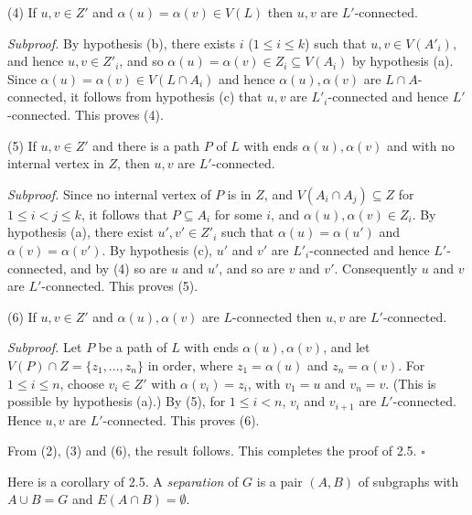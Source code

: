 \hspace*{12pt}(4) If $u, v \in Z'$ and $\alpha(u) = \alpha(v) \in V(L)$ then $u, v$ are $L'$-connected.

\textit{Subproof.} By hypothesis (b), there exists $i$ ($1 \le i \le k$) such that $u, v \in V(A'_i)$, and hence $u, v \in Z'_i$, and so $\alpha(u) = \alpha(v) \in Z_i \subseteq V(A_i)$ by hypothesis (a). Since $\alpha(u) = \alpha(v) \in V(L \cap A_i)$ and hence $\alpha(u), \alpha(v)$ are $L \cap A$-connected, it follows from hypothesis (c) that $u, v$ are $L'_i$-connected and hence $L'$-connected. This proves (4).

\hspace*{12pt}(5) If $u, v \in Z'$ and there is a path $P$ of $L$ with ends $\alpha(u), \alpha(v)$ and with no internal vertex in $Z$, then $u, v$ are $L'$-connected.

\textit{Subproof.} Since no internal vertex of $P$ is in $Z$, and $V(A_i \cap A_j) \subseteq Z$ for $1 \le i < j \le k$, it follows that $P \subseteq A_i$ for some $i$, and $\alpha(u), \alpha(v) \in Z_i$. By hypothesis (a), there exist $u', v' \in Z'_i$ such that $\alpha(u) = \alpha(u')$ and $\alpha(v) = \alpha(v')$. By hypothesis (c), $u'$ and $v'$ are $L'_i$-connected and hence $L'$-connected, and by (4) so are $u$ and $u'$, and so are $v$ and $v'$. Consequently $u$ and $v$ are $L'$-connected. This proves (5).

\hspace*{12pt}(6) If $u, v \in Z'$ and $\alpha(u), \alpha(v)$ are $L$-connected then $u, v$ are $L'$-connected.

\textit{Subproof.} Let $P$ be a path of $L$ with ends $\alpha(u), \alpha(v)$, and let $V(P) \cap Z = \{z_1, \ldots, z_n\}$ in order, where $z_1 = \alpha(u)$ and $z_n = \alpha(v)$. For $1 \le i \le n$, choose $v_i \in Z'$ with $\alpha(v_i) = z_i$, with $v_1 = u$ and $v_n = v$. (This is possible by hypothesis (a).) By (5), for $1 \le i < n$, $v_i$ and $v_{i+1}$ are $L'$-connected. Hence $u, v$ are $L'$-connected. This proves (6).

From (2), (3) and (6), the result follows. This completes the proof of 2.5. $\square$

Here is a corollary of 2.5. A \textit{separation} of $G$ is a pair $(A, B)$ of subgraphs with $A \cup B = G$ and $E(A \cap B) = \emptyset$.
